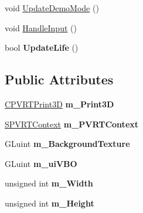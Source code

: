 \begin{DoxyCompactItemize}
\item 
void \hyperlink{class_o_g_l_e_s3_game_of_life_a82baabc98b81419b5617f1904bc3e363}{Update\+Demo\+Mode} ()
\item 
void \hyperlink{class_o_g_l_e_s3_game_of_life_abc288cff4676bae9ccd849dca36d5bcf}{Handle\+Input} ()
\item 
\hypertarget{class_o_g_l_e_s3_game_of_life_a79c31c1fd477f413f3ed915337d66f8d}{bool {\bfseries Update\+Life} ()}\label{class_o_g_l_e_s3_game_of_life_a79c31c1fd477f413f3ed915337d66f8d}

\end{DoxyCompactItemize}
\subsection*{Public Attributes}
\begin{DoxyCompactItemize}
\item 
\hypertarget{class_o_g_l_e_s3_game_of_life_a4f4f9e707de0a4de411eb0c23b4fbfe0}{\hyperlink{class_c_p_v_r_t_print3_d}{C\+P\+V\+R\+T\+Print3\+D} {\bfseries m\+\_\+\+Print3\+D}}\label{class_o_g_l_e_s3_game_of_life_a4f4f9e707de0a4de411eb0c23b4fbfe0}

\item 
\hypertarget{class_o_g_l_e_s3_game_of_life_a9313dc82f24fa44d66f3d1439e4b97e2}{\hyperlink{struct_s_p_v_r_t_context}{S\+P\+V\+R\+T\+Context} {\bfseries m\+\_\+\+P\+V\+R\+T\+Context}}\label{class_o_g_l_e_s3_game_of_life_a9313dc82f24fa44d66f3d1439e4b97e2}

\item 
\hypertarget{class_o_g_l_e_s3_game_of_life_a59d56f976660b753a2d261e8ab9621d3}{G\+Luint {\bfseries m\+\_\+\+Background\+Texture}}\label{class_o_g_l_e_s3_game_of_life_a59d56f976660b753a2d261e8ab9621d3}

\item 
\hypertarget{class_o_g_l_e_s3_game_of_life_a2ec2324cc93d3613490550357687f0ff}{G\+Luint {\bfseries m\+\_\+ui\+V\+B\+O}}\label{class_o_g_l_e_s3_game_of_life_a2ec2324cc93d3613490550357687f0ff}

\item 
\hypertarget{class_o_g_l_e_s3_game_of_life_af233d85d1c8b033281dee08593146521}{unsigned int {\bfseries m\+\_\+\+Width}}\label{class_o_g_l_e_s3_game_of_life_af233d85d1c8b033281dee08593146521}

\item 
\hypertarget{class_o_g_l_e_s3_game_of_life_ac3ffe367327380bc2be587fd85cd5beb}{unsigned int {\bfseries m\+\_\+\+Height}}\label{class_o_g_l_e_s3_game_of_life_ac3ffe367327380bc2be587fd85cd5beb}


\end{DoxyCompactItemize}
